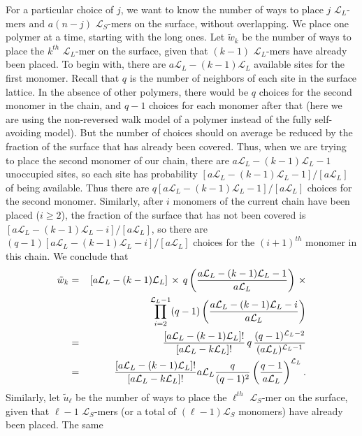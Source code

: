 \documentclass[journal=mamobx,manuscript=article]{achemso}
\newcommand{\leng}{\mathcal{L}}
\begin{document}
For a particular choice of $j$, we want to know the number of ways to place $j$ $\leng_L$-mers 
and $a(n-j)$ $\leng_S$-mers on the surface,
without overlapping.  %
We place one polymer at a time, starting with the long ones.
Let $\tilde{w}_k$ be the number of ways to place the $k^{th}$ $\leng_L$-mer on the surface, given that
$(k-1)$ $\leng_L$-mers have already been placed.  
To begin with, there are $a\leng_L-(k-1)\leng_L$ available sites for the first monomer.  Recall that  $q$ is the number of
neighbors of each site in the surface lattice.
In the absence of other polymers, there would be $q$ choices for the second monomer in the chain,
and $q-1$ choices for each monomer after that (here we are using the non-reversed walk model of a polymer
instead of the fully self-avoiding model).  But the number of choices should on average be reduced 
by the fraction of the surface that has already been covered.  
Thus, when we are trying to place the second monomer of our chain, there are
$a\leng_L-(k-1)\leng_L-1$ unoccupied sites, so each site has 
probability $[a\leng_L-(k-1)\leng_L-1]/[a\leng_L]$ of being available.  
Thus there are $q[a\leng_L-(k-1)\leng_L-1]/[a\leng_L]$ choices for the second monomer.  
Similarly, after $i$ monomers of the current chain have been placed ($i\geq 2$), the fraction of the
surface that has not been covered is $[a\leng_L-(k-1)\leng_L-i]/[a\leng_L]$, so there are 
$(q-1)[a\leng_L-(k-1)\leng_L-i]/[a\leng_L]$ choices for the $(i+1)^{th}$ monomer in this chain.  
We conclude that 
\begin{eqnarray}
   \tilde{w}_k  & = &   [a\leng_L-(k-1)\leng_L]\,\times \,q\left(\frac{ a\leng_L-(k-1)\leng_L-1}{a\leng_L}\right)    \,\times
   \nonumber    \\
   & &    \hspace{22mm}
     \prod_{i=2}^{\leng_L-1}(q-1)\left(\frac{ a\leng_L-(k-1)\leng_L-i}{a\leng_L}\right)  
      \nonumber \\
 & = &    \frac{[a\leng_L-(k-1)\leng_L]!}{[a\leng_L-k\leng_L]!} \,q\,  \frac{(q-1)^{\leng_L-2}}{(a\leng_L)^{\leng_L-1}}  
     \nonumber    \\
     & = &    \frac{[a\leng_L-(k-1)\leng_L]!}{[a\leng_L-k\leng_L]!}   a\leng_L \frac{q}{(q-1)^2}\left(  \frac{q-1}{a\leng_L}\right)^{\leng_L}.
     \label{eq.wk2supp}
\end{eqnarray}
Similarly, let $\tilde{u}_{\ell}$ be the number of ways to place the $\ell^{th}$ $\leng_S$-mer on the surface, given that
${\ell}-1$ $\leng_S$-mers (or a total of $(\ell-1)\leng_S$ monomers) have already been placed.   The same 
\end{document}
